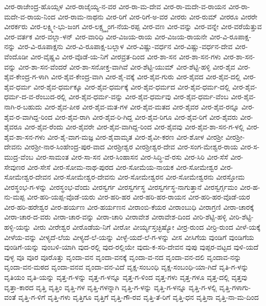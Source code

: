 ವೀರ-ರಾಜೇಂದ್ರ-ಹೊಯ್ಸಳ
ವೀರ-ರಾಜೈಯ್ಯ-ನ-ವರ
ವೀರ-ರಾ-ಮ-ದೇವ
ವೀರ-ರಾ-ಮದೇ-ವ-ರಾಯನ
ವೀರ-ರಾ-ಮದೇ-ವ-ರಾಯ-ನಿಂದ
ವೀರ-ರಾಮ-ನಾಥನು
ವೀರ-ರಿಗೆ
ವೀರ-ರಿಗೆ-ಅ-ವರ
ವೀರರು
ವೀರ-ರುಮ್
ವೀರರೂ
ವೀರರೇ
ವೀರರ್ಕರು
ವೀರ-ಲಕ್ಷ್ಮೀ-ಭು-ಜಂಗ
ವೀರ-ಲಕ್ಷ್ಷ್ಮ್ಯಂಗ-ನೆಯ-ರಪ್ಪ
ವೀರ-ವಣ
ವೀರ-ವನ್ನು
ವೀರ-ವನ್ನೇ
ವೀರ-ವರೆಯೆತ್ತುವ
ವೀರ-ವರ್ತಕ
ವೀರ-ವಲ್ಲಾ-ಳನ್
ವೀರ-ವಾರಿಧಿ
ವೀರ-ವಿಜಯ-ರಾಯ
ವೀರ-ವಿಜಯ-ರಾಯನೇ
ವೀರ-ವಿ-ರೂಪಾಕ್ಷ-ನನ್ನು
ವೀರ-ವಿ-ರೂಪಾಕ್ಷನು
ವೀರ-ವಿ-ರೂಪಾಕ್ಷ-ಬಲ್ಲಾಳ
ವೀರ-ವಿಷ್ಣು-ವರ್ಧನ
ವೀರ-ವಿಷ್ಣು-ವರ್ಧನ-ದೇವ
ವೀರ-ವೆಂದೊಡೀ
ವೀರ-ವೈಷ್ಣವಿ
ವೀರ-ವೊಡೆ-ಯ-ನಿಗೆ
ವೀರವ್ರತ-ದಿಂದ
ವೀರ-ಶಾ-ಸನ
ವೀರ-ಶಾ-ಸನ-ಗಳು
ವೀರ-ಶಾ-ಸನ-ವನ್ನು
ವೀರ-ಶಾ-ಸನ-ವೆಂದರೆ
ವೀರ-ಶಾ-ಸನೋಕ್ತ-ವಾಗಿವೆ
ವೀರ-ಶೆಟ್ಟಿ-ಯುಮ್
ವೀರ-ಶೆಟ್ಟಿ-ಹಳ್ಳಿ
ವೀರ-ಶೈವ
ವೀರ-ಶೈವ-ಕೇಂದ್ರ-ಗ-ಳಾಗಿ
ವೀರ-ಶೈವ-ಕೇಂದ್ರ-ವಾಗಿ
ವೀರ-ಶೈ-ವಕ್ಕೆ
ವೀರ-ಶೈವ-ಗುರು
ವೀರ-ಶೈವದ
ವೀರ-ಶೈವ-ದಲ್ಲಿ
ವೀರ-ಶೈವ-ಧರ್ಮ
ವೀರ-ಶೈವ-ಧರ್ಮಕ್ಕೂ
ವೀರ-ಶೈವ-ಧರ್ಮಕ್ಕೆ
ವೀರ-ಶೈವ-ಧರ್ಮದ
ವೀರ-ಶೈವ-ಧರ್ಮ-ದಲ್ಲಿ
ವೀರ-ಶೈವ-ಧರ್ಮ-ದ-ವ-ರೆಂಬುದ-ರಲ್ಲಿ
ವೀರ-ಶೈವ-ಧರ್ಮ-ವನ್ನು
ವೀರ-ಶೈವ-ಧರ್ಮವು
ವೀರ-ಶೈವ-ಧರ್ಮ-ವೆಂಬ
ವೀರ-ಶೈವ-ನಾಗಿ-ರ-ಬಹುದು
ವೀರ-ಶೈವ-ಪೀಠ
ವೀರ-ಶೈವ-ಮತ-ಗಳ
ವೀರ-ಶೈವ-ಮತದ
ವೀರ-ಶೈವರ
ವೀರ-ಶೈವ-ರನ್ನೂ
ವೀರ-ಶೈವ-ರ-ವಾಗಿದ್ದ-ರಿಂದ
ವೀರ-ಶೈವ-ರಾಗಿ
ವೀರ-ಶೈವ-ರಿ-ಗಿದ್ದ
ವೀರ-ಶೈವ-ರಿಗೂ
ವೀರ-ಶೈವ-ರಿಗೆ
ವೀರ-ಶೈವರು
ವೀರ-ಶೈವರೂ
ವೀರ-ಶೈವ-ರೆಂದು
ವೀರ-ಶೈವರೇ
ವೀರ-ಶೈವ-ವಾಗಿದ್ದ-ರಿಂದ
ವೀರ-ಶೈವವು
ವೀರ-ಶೈವ-ಶಾ-ಸನ-ಗ-ಳಲ್ಲಿ
ವೀರ-ಶೈವ-ಶಾ-ಸನ-ಗಳು
ವೀರ-ಶೈ-ವಾಗ-ಮಜ್ಞ
ವೀರ-ಶೈವಾಮೃತ
ವೀರ-ಶೈವೀ-ಕರಣ
ವೀರ-ಶೋಳ
ವೀರಶ್ರೀ
ವೀರಶ್ರೀ-ದೇವನು
ವೀರಶ್ರೀ-ನಾರ-ಸಿಂಹೇಂದ್ರ-ಪುರ-ವಾದ
ವೀರಶ್ರೀಶ್ವರ
ವೀರಶ್ರೀಶ್ವರ-ದೇವ
ವೀರ-ಸಂಗ-ಮೇಶ್ವರ-ರಾಯ
ವೀರ-ಸ-ಮುದ್ರ-ವೆಂಬ
ವೀರ-ಸಾಮಂತ
ವೀರ-ಸಾ-ಸನ
ವೀರ-ಸಿಂಹಾಸನ
ವೀರ-ಸಿದ್ಧಿ-ವೆ-ರಸು
ವೀರ-ಸಿರಿ
ವೀರ-ಸೆಸೆ
ವೀರ-ಸೇವುಣರ
ವೀರ-ಸೇಸೆ
ವೀರ-ಸೋಮ-ನಾಥ-ಪುರದ
ವೀರ-ಸೋಮೆಯ-ನಾಯಕ
ವೀರ-ಸೋಮೇಶ್ವರ
ವೀರ-ಸೋಮೇಶ್ವರ-ದೇವನ
ವೀರ-ಸೋಮೇಶ್ವರ-ದೇವನು
ವೀರ-ಸೋಮೇಶ್ವರನ
ವೀರ-ಸೋಮೇಶ್ವರನು
ವೀರಸ್ತೋಮ
ವೀರಸ್ಥಂಭ-ಗ-ಳನ್ನು
ವೀರಸ್ಥಂಭ-ವೆಂದು
ವೀರಸ್ವರ್ಗ
ವೀರಸ್ವರ್ಗಸ್ಥ
ವೀರಸ್ವರ್ಗಸ್ಥ-ನಾಗುತ್ತಾನೆ
ವೀರಸ್ವರ್ಗ್ಗಮಂ
ವೀರ-ಹ-ನು-ಮಪ್ಪ
ವೀರ-ಹರಿ-ಯಪ್ಪ-ವೊಡೆ-ಯರು
ವೀರ-ಹರಿ-ಹರ
ವೀರ-ಹರಿ-ಹರ-ರಾಯನ
ವೀರ-ಹರಿ-ಹರ-ವೊಡೆ-ಯರ
ವೀರ-ಹರಿ-ಹರೇಶ್ವರ
ವೀರ-ಹರ್ಯಣ
ವೀರ-ಹರ್ಯಣನ
ವೀರಾಂಬಿ-ಕೆಯರ
ವೀರಾಂಬುಧಿ
ವೀರಾಗ್ರಣಿ
ವೀರಾ-ಚಾರಕ್ಕೆ
ವೀರಾ-ಚಾರ-ದ-ವರು
ವೀರಾ-ಚಾರ-ವನ್ನು
ವೀರಾ-ಚಾರಿ
ವೀರಾವೇಶ
ವೀರಾವೇಶ-ದಿಂದ
ವೀರಿ-ಶೆಟ್ಟಿ-ಹಳ್ಳಿ
ವೀರಿ-ಶೆಟ್ಟಿ-ಹಳ್ಳಿ-ಯನ್ನು
ವೀರು
ವೀರೇಶ್ವರ
ವೀರೊಡೆಯ-ನಿಗೆ
ವೀರೋ
ವೀರ್ಯ್ಯಸ್ತಚ್ಛಿಷ್ಯೋ
ವೀರ್ರ-ರುಂದ
ವೀರ್ರಿ-ರುಂದ
ವೀಳೆ-ಯಕ್ಕೆ
ವೀಳೆಯ-ವನ್ನು
ವೀಳ್ಯದೆ-ಲೆಯ
ವೀಳ್ಯದೆ-ಲೆ-ಯನ್ನು
ವೀಳ್ಳೆ-ಯದೆ-ಲೆ-ಗ-ಳನ್ನು
ವೀಸ
ವೀಸಿಗೆಯ
ವುಂಡಿಗೆ
ವುಂಡಿಗೆಯ
ವುಂಡಿಗೆ-ಯನ್ನು
ವುಂಬಳಿ-ಯಾಗಿ
ವುದ-ರಲ್ಲಿ
ವುದ-ರಲ್ಲಿಯೇ
ವುದು-ಕ-ಸರಿ-ದೇವನ
ವುಪು
ವುಪ್ಪರ-ವಟ್ಟದ
ವುಳಿ-ಯದೆ
ವುಳ್ಳ
ವೂ
ವೂರ
ವೂರೊತ್ತು
ವೃಂದಾ-ವನ
ವೃಂದಾ-ವನಕ್ಕೆ
ವೃಂದಾ-ವ-ನದ
ವೃಂದಾ-ವನ-ದಲಿ
ವೃಂದಾವ-ನನ್ನು
ವೃಂದಾ-ವನ-ಮಠದ
ವೃಂದಾ-ವನವ
ವೃಂದಾ-ವನ-ವಿದೆ
ವೃಕ್ಷ-ಸಂಬಂಧಿ
ವೃಕ್ಷ-ಸಂಬಂಧಿ-ಯಾ-ಗಿದೆ
ವೃತಿ-ಗ-ಳನ್ನು
ವೃತಿಯಂ
ವೃತಿ-ಯನ್ನು
ವೃತ್ತ-ಗ-ಳನ್ನು
ವೃತ್ತ-ಗ-ಳನ್ನೂ
ವೃತ್ತ-ಗ-ಳಿಂದ
ವೃತ್ತ-ಗಳು
ವೃತ್ತ-ಗಳೂ
ವೃತ್ತ-ದಲ್ಲಿ
ವೃತ್ತವು
ವೃತ್ತಾ-ಕಾರದ
ವೃತ್ತಿ
ವೃತ್ತಿಂ
ವೃತ್ತಿ-ಗಳ
ವೃತ್ತಿ-ಗಳನ್ನಾಗಿ
ವೃತ್ತಿ-ಗ-ಳನ್ನು
ವೃತ್ತಿ-ಗ-ಳನ್ನೂ
ವೃತ್ತಿ-ಗ-ಳಲ್ಲಿ
ವೃತ್ತಿ-ಗಳಾಗು-ವಂತೆ
ವೃತ್ತಿ-ಗ-ಳಿಗೆ
ವೃತ್ತಿ-ಗಳು
ವೃತ್ತಿಗೂ
ವೃತ್ತಿಗೆ
ವೃತ್ತಿ-ಗೌ-ರವ
ವೃತ್ತಿ-ತೆ-ರಿಗೆ
ವೃತ್ತಿ-ಧನ
ವೃತ್ತಿನಾ
ವೃತ್ತಿ-ನಾ-ಮ-ದಿಂದ
